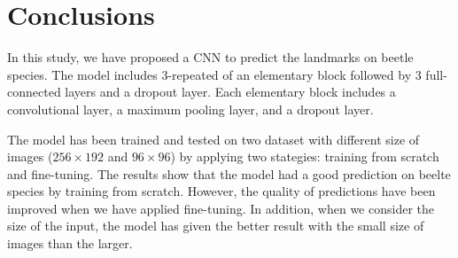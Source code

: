 \documentclass[12pt,a4paper]{article}
\begin{document}
\section{Conclusions}
In this study, we have proposed a CNN to predict the landmarks on beetle species. The model includes 3-repeated of an elementary block followed by 3 full-connected layers and a dropout layer. Each elementary block includes a convolutional layer, a maximum pooling layer, and a dropout layer.

The model has been trained and tested on two dataset with different size of images ($256 \times 192$ and $96 \times 96$) by applying two stategies: training from scratch and fine-tuning. The results show that the model had a good prediction on beelte species by training from scratch. However, the quality of predictions have been improved when we have applied fine-tuning. In addition, when we consider the size of the input, the model has given the better result with the small size of images than the larger.  

\pagebreak


\end{document}
